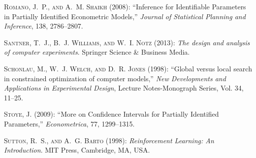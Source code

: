 \documentclass[letterpaper,11pt]{article}
\theoremstyle{myplain}
\theoremstyle{mydefinition}
\theoremstyle{myremark}
\numberwithin{equation}{section}
\numberwithin{figure}{section}
\begin{document}
\begin{thebibliography}{}
\textsc{Romano, J.~P.,  {\small and} A.~M. Shaikh}  (2008): ``Inference for
  Identifiable Parameters in Partially Identified Econometric Models,''
  \emph{Journal of Statistical Planning and Inference}, 138, 2786--2807.

\textsc{Santner, T.~J., B.~J. Williams,  {\small and} W.~I. Notz}  (2013):
  \emph{The design and analysis of computer experiments}. Springer Science \&
  Business Media.

\textsc{Schonlau, M., W.~J. Welch,  {\small and} D.~R. Jones}  (1998): ``Global
  versus local search in constrained optimization of computer models,''
  \emph{New Developments and Applications in Experimental Design}, Lecture
  Notes-Monograph Series, Vol. 34, 11--25.

\textsc{Stoye, J.}  (2009): ``More on Confidence Intervals for Partially
  Identified Parameters,'' \emph{Econometrica}, 77, 1299--1315.

\textsc{Sutton, R.~S.,  {\small and} A.~G. Barto}  (1998): \emph{Reinforcement
  Learning: An Introduction}. MIT Press, Cambridge, MA, USA.

\end{thebibliography}
\end{document}
